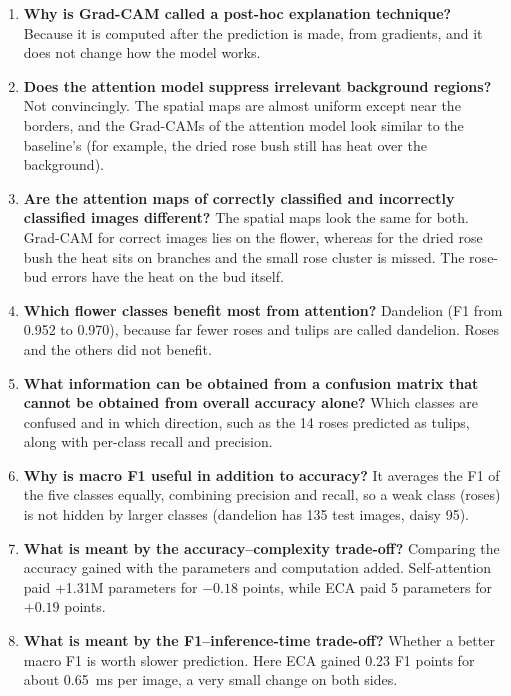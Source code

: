 \documentclass[11pt]{article}
\begin{document}
\begin{enumerate}
\item \textbf{Why is Grad-CAM called a post-hoc explanation technique?}
Because it is computed after the prediction is made, from gradients, and it
does not change how the model works.

\item \textbf{Does the attention model suppress irrelevant background regions?}
Not convincingly. The spatial maps are almost uniform except near the
borders, and the Grad-CAMs of the attention model look similar to the
baseline's (for example, the dried rose bush still has heat over the
background).

\item \textbf{Are the attention maps of correctly classified and incorrectly classified images different?}
The spatial maps look the same for both. Grad-CAM for correct images lies
on the flower, whereas for the dried rose bush the heat sits on branches and
the small rose cluster is missed. The rose-bud errors have the heat on the
bud itself.

\item \textbf{Which flower classes benefit most from attention?}
Dandelion (F1 from 0.952 to 0.970), because far fewer roses and tulips are
called dandelion. Roses and the others did not benefit.

\item \textbf{What information can be obtained from a confusion matrix that cannot be obtained from overall accuracy alone?}
Which classes are confused and in which direction, such as the 14 roses
predicted as tulips, along with per-class recall and precision.

\item \textbf{Why is macro F1 useful in addition to accuracy?}
It averages the F1 of the five classes equally, combining precision and
recall, so a weak class (roses) is not hidden by larger classes
(dandelion has 135 test images, daisy 95).

\item \textbf{What is meant by the accuracy--complexity trade-off?}
Comparing the accuracy gained with the parameters and computation added.
Self-attention paid +1.31M parameters for $-0.18$ points, while ECA paid 5
parameters for $+0.19$ points.

\item \textbf{What is meant by the F1--inference-time trade-off?}
Whether a better macro F1 is worth slower prediction. Here ECA gained 0.23
F1 points for about 0.65~ms per image, a very small change on both sides.


\end{enumerate}
\end{document}

